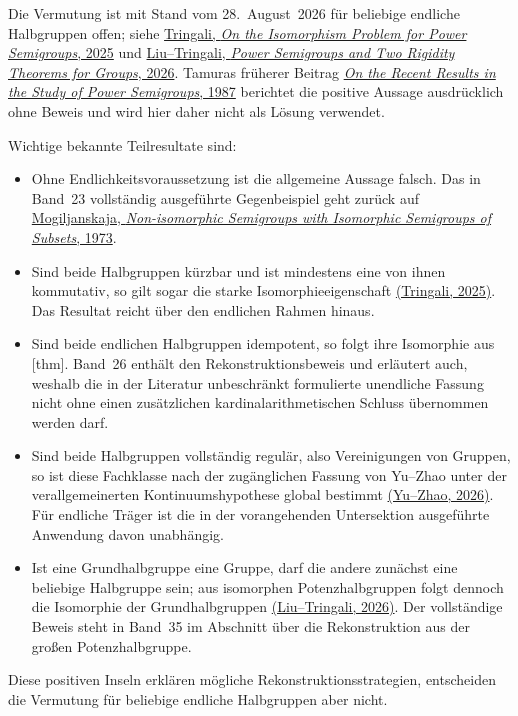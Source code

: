 \documentclass[main.tex]{subfiles}
\begin{document}
\begin{remark}
Die Vermutung ist mit Stand vom 28.~August~2026 für beliebige endliche
Halbgruppen offen; siehe
\href{https://doi.org/10.1007/978-3-031-75326-8_20}%
  {Tringali, \emph{On the Isomorphism Problem for Power Semigroups}, 2025}
und
\href{https://doi.org/10.48550/arXiv.2606.01917}%
  {Liu--Tringali, \emph{Power Semigroups and Two Rigidity Theorems for
  Groups}, 2026}.
Tamuras früherer Beitrag
\href{https://doi.org/10.1007/978-94-009-3839-7_22}%
  {\emph{On the Recent Results in the Study of Power Semigroups}, 1987}
berichtet die positive Aussage ausdrücklich ohne Beweis und wird hier daher
nicht als Lösung verwendet.

Wichtige bekannte Teilresultate sind:
\begin{itemize}
  \item Ohne Endlichkeitsvoraussetzung ist die allgemeine Aussage falsch.
    Das in Band~23 vollständig ausgeführte Gegenbeispiel geht zurück auf
    \href{https://doi.org/10.1007/BF02389140}%
      {Mogiljanskaja, \emph{Non-isomorphic Semigroups with Isomorphic
      Semigroups of Subsets}, 1973}.
  \item Sind beide Halbgruppen kürzbar und ist mindestens eine von ihnen
    kommutativ, so gilt sogar die starke Isomorphieeigenschaft
    \href{https://doi.org/10.1007/978-3-031-75326-8_20}%
      {(Tringali, 2025)}.  Das Resultat reicht über den endlichen Rahmen
      hinaus.
  \item Sind beide endlichen Halbgruppen idempotent, so folgt ihre
    Isomorphie aus
    [thm].
    Band~26 enthält den Rekonstruktionsbeweis und erläutert auch, weshalb
    die in der Literatur unbeschränkt formulierte unendliche Fassung nicht
    ohne einen zusätzlichen kardinalarithmetischen Schluss übernommen
    werden darf.
  \item Sind beide Halbgruppen vollständig regulär, also Vereinigungen von
    Gruppen, so ist diese Fachklasse nach der zugänglichen Fassung von
    Yu--Zhao unter der verallgemeinerten Kontinuumshypothese global bestimmt
    \href{https://doi.org/10.1080/00927872.2026.2659846}%
      {(Yu--Zhao, 2026)}.  Für endliche Träger ist die in der vorangehenden
      Untersektion ausgeführte Anwendung davon unabhängig.
  \item Ist eine Grundhalbgruppe eine Gruppe, darf die andere zunächst eine
    beliebige Halbgruppe sein; aus isomorphen Potenzhalbgruppen folgt
    dennoch die Isomorphie der Grundhalbgruppen
    \href{https://doi.org/10.48550/arXiv.2606.01917}%
      {(Liu--Tringali, 2026)}.  Der vollständige Beweis steht in Band~35 im
      Abschnitt über die Rekonstruktion aus der großen Potenzhalbgruppe.
\end{itemize}
Diese positiven Inseln erklären mögliche Rekonstruktionsstrategien, entscheiden
die Vermutung für beliebige endliche Halbgruppen aber nicht.
\end{remark}
\end{document}
